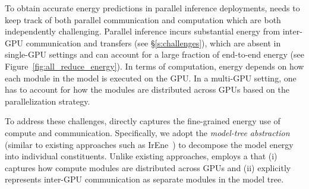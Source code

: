 To obtain accurate energy predictions in parallel inference deployments, 
\sys{} needs to keep track of both parallel communication and computation which are both independently challenging. Parallel inference incurs substantial energy from inter-GPU communication and transfers (see \S\ref{s:challenges}),
which are absent in single-GPU settings and can account for a large fraction of end-to-end energy (see Figure~\ref{fig:all_reduce_energy}). 
In terms of computation, energy depends on how each module in the model is executed on the GPU. %
In a multi-GPU setting, one has to account for how the modules are distributed across GPUs based on the parallelization strategy.

To address these challenges,
\sys{} directly captures the fine-grained energy use of compute and communication. %
Specifically, we adopt the \emph{model-tree abstraction} (similar to existing approaches such as IrEne~\cite{irene, neuralpower}) to decompose the model energy into individual constituents. 
Unlike existing approaches, \sys{} employs a  that (i) captures how compute modules are distributed across GPUs and (ii) explicitly represents inter-GPU communication as separate modules in the model tree.
%

